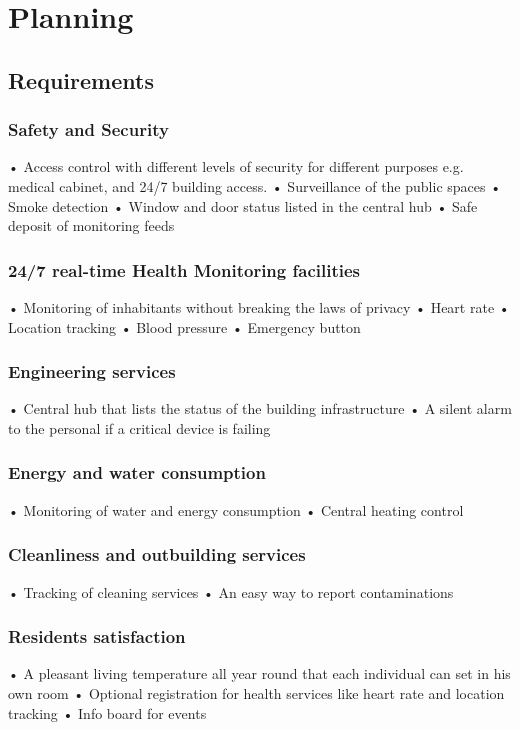 
\chapter{Planning}
\label{sec:org2610146}
\section{Requirements}
\label{sec:org945b9f4}
\subsection{Safety and Security}
\label{sec:org34def69}
•	Access control with different levels of security for different purposes e.g. medical cabinet, and 24/7 building access.
•	Surveillance of the public spaces
•	Smoke detection
•	Window and door status listed in the central hub
•	Safe deposit of monitoring feeds
\subsection{24/7 real-time Health Monitoring facilities}
\label{sec:orge43b7b8}
•	Monitoring of inhabitants without breaking the laws of privacy
•	Heart rate
•	Location tracking
•	Blood pressure
•	Emergency button
\subsection{Engineering services}
\label{sec:org3b95898}
•	Central hub that lists the status of the building infrastructure 
•	A silent alarm to the personal if a critical device is failing
\subsection{Energy and water consumption}
\label{sec:orgd85891f}
•	Monitoring of water and energy consumption
•	Central heating control
\subsection{Cleanliness and outbuilding services}
\label{sec:orga2926ad}
•	Tracking of cleaning services
•	An easy way to report contaminations
\subsection{Residents satisfaction}
\label{sec:orgd7a0521}
•	A pleasant living temperature all year round that each individual can set in his own room
•	Optional registration for health services like heart rate and location tracking
•	Info board for events


